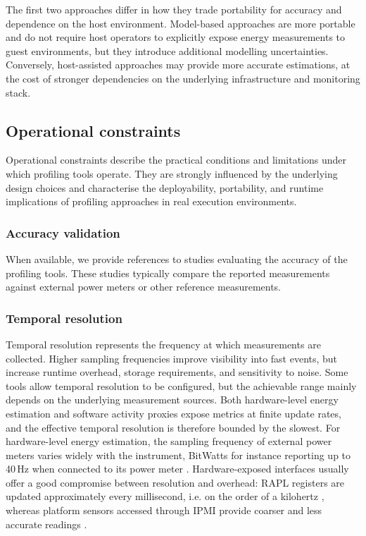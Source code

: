 \documentclass[
  acmsmall,
  screen,
  review,
  xcolor={dvipsnames,usenames}
]{acmart}
\begin{document}
The first two approaches differ in how they trade portability for accuracy and dependence on the host environment. Model-based approaches are more portable and do not require host operators to explicitly expose energy measurements to guest environments, but they introduce additional modelling uncertainties. Conversely, host-assisted approaches may provide more accurate estimations, at the cost of stronger dependencies on the underlying infrastructure and monitoring stack.

\subsection{Operational constraints}

Operational constraints describe the practical conditions and limitations under which profiling tools operate. They are strongly influenced by the underlying design choices and characterise the deployability, portability, and runtime implications of profiling approaches in real execution environments.

\subsubsection{\textbf{Accuracy validation}}

When available, we provide references to studies evaluating the accuracy of the profiling tools. These studies typically compare the reported measurements against external power meters or other reference measurements.

\subsubsection{\textbf{Temporal resolution}} \label{sec:temporal-resolution}

Temporal resolution represents the frequency at which measurements are collected. Higher sampling frequencies improve visibility into fast events, but increase runtime overhead, storage requirements, and sensitivity to noise.
Some tools allow temporal resolution to be configured, but the achievable range mainly depends on the underlying measurement sources. Both hardware-level energy estimation and software activity proxies expose metrics at finite update rates, and the effective temporal resolution is therefore bounded by the slowest. For hardware-level energy estimation, the sampling frequency of external power meters varies widely with the instrument, BitWatts for instance reporting up to 40\,Hz when connected to its power meter \cite{colmantProcesslevelPowerEstimation2015}. Hardware-exposed interfaces usually offer a good compromise between resolution and overhead: RAPL registers are updated approximately every millisecond, i.e. on the order of a kilohertz \cite{khanRAPLActionExperiences2018}, whereas platform sensors accessed through IPMI provide coarser and less accurate readings \cite{khanRAPLActionExperiences2018}.
\end{document}
